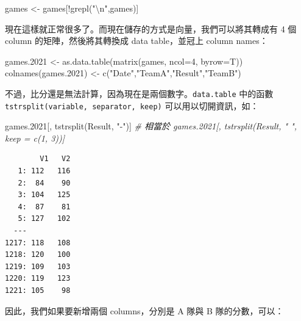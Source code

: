 \documentclass[
]{book}
\newenvironment{Shaded}{\begin{snugshade}}{\end{snugshade}}
\newcommand{\AttributeTok}[1]{\textcolor[rgb]{0.77,0.63,0.00}{#1}}
\newcommand{\CommentTok}[1]{\textcolor[rgb]{0.56,0.35,0.01}{\textit{#1}}}
\newcommand{\ConstantTok}[1]{\textcolor[rgb]{0.00,0.00,0.00}{#1}}
\newcommand{\DecValTok}[1]{\textcolor[rgb]{0.00,0.00,0.81}{#1}}
\newcommand{\ErrorTok}[1]{\textcolor[rgb]{0.64,0.00,0.00}{\textbf{#1}}}
\newcommand{\FloatTok}[1]{\textcolor[rgb]{0.00,0.00,0.81}{#1}}
\newcommand{\FunctionTok}[1]{\textcolor[rgb]{0.00,0.00,0.00}{#1}}
\newcommand{\NormalTok}[1]{#1}
\newcommand{\OtherTok}[1]{\textcolor[rgb]{0.56,0.35,0.01}{#1}}
\newcommand{\SpecialCharTok}[1]{\textcolor[rgb]{0.00,0.00,0.00}{#1}}
\newcommand{\StringTok}[1]{\textcolor[rgb]{0.31,0.60,0.02}{#1}}
\theoremstyle{definition}
\theoremstyle{remark}
\begin{document}
\begin{Shaded}
\begin{Highlighting}[]
\NormalTok{games }\OtherTok{\textless{}{-}}\NormalTok{ games[}\SpecialCharTok{!}\FunctionTok{grepl}\NormalTok{(}\StringTok{"}\SpecialCharTok{\textbackslash{}n}\StringTok{"}\NormalTok{,games)]}
\end{Highlighting}
\end{Shaded}

現在這樣就正常很多了。而現在儲存的方式是向量，我們可以將其轉成有 4 個 column 的矩陣，然後將其轉換成 data table，並冠上 column names：

\begin{Shaded}
\begin{Highlighting}[]
\NormalTok{games}\FloatTok{.2021} \OtherTok{\textless{}{-}} \FunctionTok{as.data.table}\NormalTok{(}\FunctionTok{matrix}\NormalTok{(games, }\AttributeTok{ncol=}\DecValTok{4}\NormalTok{, }\AttributeTok{byrow=}\NormalTok{T))}
\FunctionTok{colnames}\NormalTok{(games}\FloatTok{.2021}\NormalTok{) }\OtherTok{\textless{}{-}} \FunctionTok{c}\NormalTok{(}\StringTok{"Date"}\NormalTok{,}\StringTok{"TeamA"}\NormalTok{,}\StringTok{"Result"}\NormalTok{,}\StringTok{"TeamB"}\NormalTok{)}
\end{Highlighting}
\end{Shaded}

不過，比分還是無法計算，因為現在是兩個數字。\texttt{data.table} 中的函數 \texttt{tstrsplit(variable,\ separator,\ keep)} 可以用以切開資訊，如：

\begin{Shaded}
\begin{Highlighting}[]
\NormalTok{games}\FloatTok{.2021}\NormalTok{[, }\FunctionTok{tstrsplit}\NormalTok{(Result, }\StringTok{"{-}"}\NormalTok{)]}
\CommentTok{\# 相當於 games.2021[, tstrsplit(Result, " ", keep = c(1, 3))]}
\end{Highlighting}
\end{Shaded}

\begin{verbatim}
        V1   V2
   1: 112   116
   2:  84    90
   3: 104   125
   4:  87    81
   5: 127   102
  ---          
1217: 118   108
1218: 120   100
1219: 109   103
1220: 119   123
1221: 105    98
\end{verbatim}

因此，我們如果要新增兩個 columns，分別是 A 隊與 B 隊的分數，可以：

\begin{Shaded}
\end{Shaded}
\end{document}
